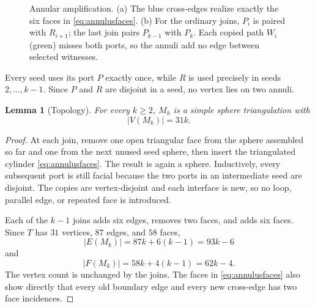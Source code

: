 \documentclass[11pt]{article}
\newtheorem{lemma}[theorem]{Lemma}
\theoremstyle{definition}
\theoremstyle{remark}
\begin{document}
\begin{figure}[htbp]
\begin{minipage}[c]{.55\textwidth}
\end{minipage}
\caption{Annular amplification.  (a) The blue cross-edges realize exactly
the six faces in \eqref{eq:annulusfaces}.  (b) For the ordinary joins, $P_i$
is paired with $R_{i+1}$; the last join pairs $P_{k-1}$ with $P_k$.  Each
copied path $W_i$ (green) misses both ports, so the annuli add no edge between
selected witnesses.}
\label{fig:annulus-family}
\end{figure}

Every seed uses its port $P$ exactly once, while $R$ is used precisely in
seeds $2,\ldots,k-1$.  Since $P$ and $R$ are disjoint in a seed, no vertex
lies on two annuli.

\begin{lemma}[Topology]\label{lem:topology}
For every $k\ge2$, $M_k$ is a simple sphere triangulation with
\[
 |V(M_k)|=31k.
\]
\end{lemma}

\begin{proof}
 At each join, remove one open triangular face from the sphere assembled so
 far and one from the next unused seed sphere, then insert the triangulated
 cylinder
\eqref{eq:annulusfaces}.  The result is again a sphere.  Inductively, every
subsequent port is still facial because the two ports in an intermediate
seed are disjoint.  The copies are vertex-disjoint and each interface is new,
so no loop, parallel edge, or repeated face is introduced.

Each of the $k-1$ joins adds six edges, removes two faces, and adds six
faces.  Since $T$ has $31$ vertices, $87$ edges, and $58$ faces,
\[
 |E(M_k)|=87k+6(k-1)=93k-6
\]
and
\[
 |F(M_k)|=58k+4(k-1)=62k-4.
\]
The vertex count is unchanged by the joins.  The faces in
\eqref{eq:annulusfaces} also show directly that every old boundary edge and
every new cross-edge has two face incidences.
\end{proof}
\end{document}
